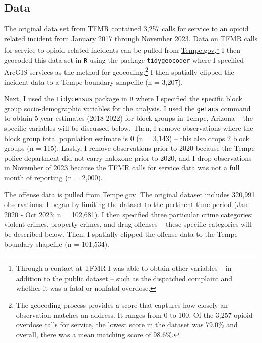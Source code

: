 \subsection{Data}
The original data set from TFMR contained 3,257 calls for service to an opioid related incident from January 2017 through November 2023. Data on TFMR calls for service to opioid related incidents can be pulled from \href{https://data.tempe.gov/datasets/2daeeafd2741494c8294ca415e5a793e_0/explore?location=33.398962%2C-111.931850%2C11.94}{Tempe.gov}.\footnote{Through a contact at TFMR I was able to obtain other variables -- in addition to the public dataset -- such as the dispatched complaint and whether it was a fatal or nonfatal overdose.} I then geocoded this data set in \texttt{R} using the package \texttt{tidygeocoder} where I specified ArcGIS services as the method for geocoding.\footnote{The geocoding process provides a score that captures how closely an observation matches an address. It ranges from 0 to 100. Of the 3,257 opioid overdose calls for service, the lowest score in the dataset was 79.0\% and overall, there was a mean matching score of 98.6\%.} I then spatially clipped the incident data to a Tempe boundary shapefile (n = 3,207). 

Next, I used the \texttt{tidycensus} package in \texttt{R} where I specified the specific block group socio-demographic variables for the analysis. I used the \texttt{getacs} command to obtain 5-year estimates (2018-2022) for block groups in Tempe, Arizona -- the specific variables will be discussed below. Then, I remove observations where the block group total population estimate is 0 (n = 3,143) -- this also drops 2 block groups (n = 115). Lastly, I remove observations prior to 2020 because the Tempe police department did not carry naloxone prior to 2020, and I drop observations in November of 2023 because the TFMR calls for service data was not a full month of reporting (n = 2,000). 

The offense data is pulled from \href{https://data.tempe.gov/datasets/1563be5b343b4f78b1163e97a9a503ad_0/explore?location=32.279019%2C-112.767075%2C7.97}{Tempe.gov}. The original dataset includes 320,991 observations. I began by limiting the dataset to the pertinent time period (Jan 2020 - Oct 2023; n = 102,681). I then specified three particular crime categories: violent crimes, property crimes, and drug offenses -- these specific categories will be described below. Then, I spatially clipped the offense data to the Tempe boundary shapefile (n = 101,534). 

